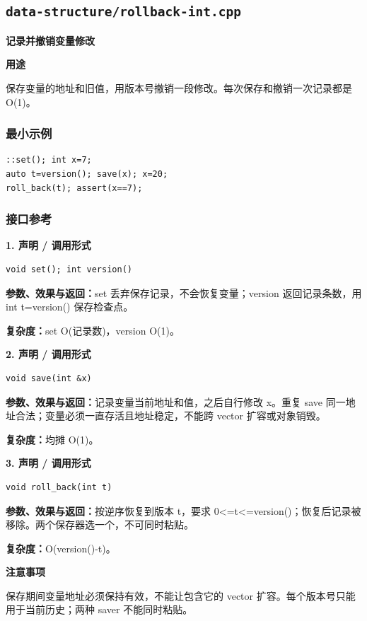 \documentclass[UTF8,a4paper,10pt]{ctexart}
\newcommand{\TemplUsage}[1]{\textbf{用途}\par #1\par}
\newcommand{\TemplNote}[1]{\textbf{注意事项}\par #1\par}
\begin{document}
\subsection{\texttt{data-structure/rollback-int.cpp}}
\textbf{记录并撤销变量修改}\par
\TemplUsage{保存变量的地址和旧值，用版本号撤销一段修改。每次保存和撤销一次记录都是 O(1)。}
\subsubsection*{最小示例}
\begin{lstlisting}
::set(); int x=7;
auto t=version(); save(x); x=20;
roll_back(t); assert(x==7);
\end{lstlisting}
\subsubsection*{接口参考}
\noindent\begin{minipage}{\textwidth}
\textbf{1. 声明 / 调用形式}
\begin{lstlisting}
void set(); int version()
\end{lstlisting}
\textbf{参数、效果与返回：}set 丢弃保存记录，不会恢复变量；version 返回记录条数，用 int t=version() 保存检查点。

\textbf{复杂度：}set O(记录数)，version O(1)。

\end{minipage}\par\vspace{0.4em}
\noindent\begin{minipage}{\textwidth}
\textbf{2. 声明 / 调用形式}
\begin{lstlisting}
void save(int &x)
\end{lstlisting}
\textbf{参数、效果与返回：}记录变量当前地址和值，之后自行修改 x。重复 save 同一地址合法；变量必须一直存活且地址稳定，不能跨 vector 扩容或对象销毁。

\textbf{复杂度：}均摊 O(1)。

\end{minipage}\par\vspace{0.4em}
\noindent\begin{minipage}{\textwidth}
\textbf{3. 声明 / 调用形式}
\begin{lstlisting}
void roll_back(int t)
\end{lstlisting}
\textbf{参数、效果与返回：}按逆序恢复到版本 t，要求 0<=t<=version()；恢复后记录被移除。两个保存器选一个，不可同时粘贴。

\textbf{复杂度：}O(version()-t)。

\TemplNote{保存期间变量地址必须保持有效，不能让包含它的 vector 扩容。每个版本号只能用于当前历史；两种 saver 不能同时粘贴。}
\end{minipage}\par\vspace{0.4em}
\clearpage
\end{document}

